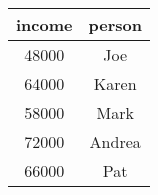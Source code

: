 \documentclass[]{book}
\newenvironment{Shaded}{\begin{snugshade}}{\end{snugshade}}
\newcommand{\KeywordTok}[1]{\textcolor[rgb]{0.13,0.29,0.53}{\textbf{#1}}}
\newcommand{\StringTok}[1]{\textcolor[rgb]{0.31,0.60,0.02}{#1}}
\newcommand{\OperatorTok}[1]{\textcolor[rgb]{0.81,0.36,0.00}{\textbf{#1}}}
\newcommand{\NormalTok}[1]{#1}
\theoremstyle{definition}
\theoremstyle{definition}
\theoremstyle{definition}
\theoremstyle{remark}
\begin{document}
\begin{longtable}[]{@{}cc@{}}
\toprule
\begin{minipage}[b]{0.12\columnwidth}\centering\strut
income\strut
\end{minipage} & \begin{minipage}[b]{0.12\columnwidth}\centering\strut
person\strut
\end{minipage}\tabularnewline
\midrule
\endhead
\begin{minipage}[t]{0.12\columnwidth}\centering\strut
48000\strut
\end{minipage} & \begin{minipage}[t]{0.12\columnwidth}\centering\strut
Joe\strut
\end{minipage}\tabularnewline
\begin{minipage}[t]{0.12\columnwidth}\centering\strut
64000\strut
\end{minipage} & \begin{minipage}[t]{0.12\columnwidth}\centering\strut
Karen\strut
\end{minipage}\tabularnewline
\begin{minipage}[t]{0.12\columnwidth}\centering\strut
58000\strut
\end{minipage} & \begin{minipage}[t]{0.12\columnwidth}\centering\strut
Mark\strut
\end{minipage}\tabularnewline
\begin{minipage}[t]{0.12\columnwidth}\centering\strut
72000\strut
\end{minipage} & \begin{minipage}[t]{0.12\columnwidth}\centering\strut
Andrea\strut
\end{minipage}\tabularnewline
\begin{minipage}[t]{0.12\columnwidth}\centering\strut
66000\strut
\end{minipage} & \begin{minipage}[t]{0.12\columnwidth}\centering\strut
Pat\strut
\end{minipage}\tabularnewline
\bottomrule
\end{longtable}

\begin{Shaded}
\end{Shaded}
\end{document}
